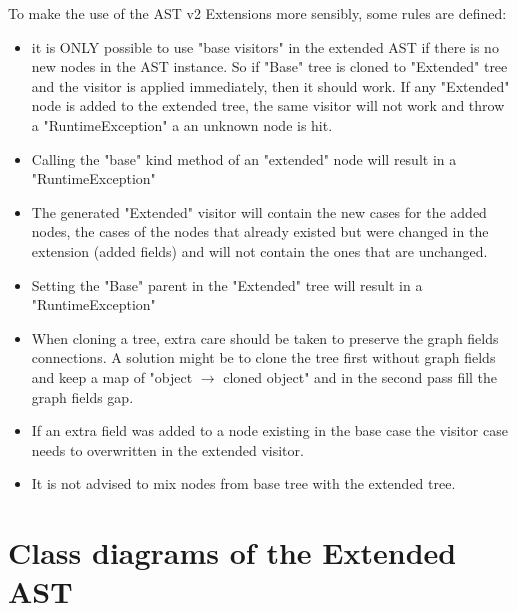 \documentclass{overturerepchap}
\begin{document}
To make the use of the AST v2 Extensions more sensibly, some rules are defined:
\begin{itemize}
\item it is ONLY possible to use "base visitors" in the extended AST if there is no new nodes in the AST instance. So if "Base" tree is cloned to "Extended" tree and the visitor is applied immediately, then it should work. If any "Extended" node is added to the extended  tree, the same visitor will not work and throw a "RuntimeException" a an unknown node is hit.
\item Calling the "base" kind method of an "extended" node will result in a "RuntimeException"
\item The generated "Extended" visitor will contain the new cases for the added nodes, the cases of the nodes that already existed but were changed in the extension (added fields) and will not contain the ones that are unchanged.
\item Setting the "Base" parent in the "Extended" tree will result in a "RuntimeException"
\item When cloning a tree, extra care should be taken to preserve the graph fields connections. A solution might be to clone the tree first without graph fields and keep a map of "object $\rightarrow$ cloned object" and in the second pass fill the graph fields gap.
\item If an extra field was added to a node existing in the base case the visitor case needs to overwritten in the extended visitor.
\item It is not advised to mix nodes from base tree with the extended tree.
\end{itemize}

\appendix

\chapter{Class diagrams of the Extended AST}
\end{document}
